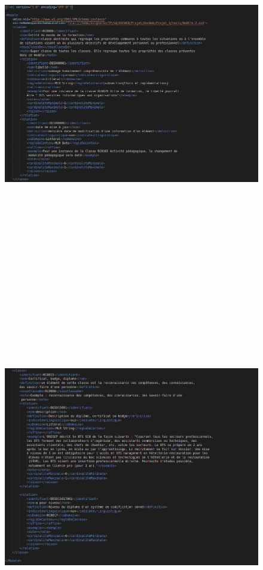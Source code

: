 \documentclass{article}
\begin{document}
\begin{figure}[!ht]
    \centering
    \includegraphics[scale=0.5,width=18cm, height=16cm]{img/ex_xml_1}
\end{figure}

\newpage
\begin{figure}[!ht]
    \includegraphics[scale=0.5,width=18cm, height=16cm]{img/ex_xml_2}
\end{figure}
\end{document}
